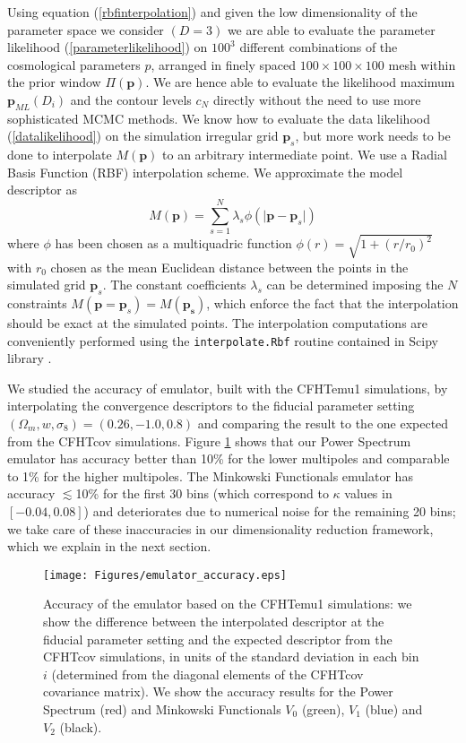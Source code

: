 \documentclass[reprint,aps,prd,superscriptaddress,showkeys,showpacs]{revtex4-1}
\begin{document}
Using equation (\ref{rbfinterpolation}) and given the low dimensionality of the parameter space we consider $(D=3)$ we are able to evaluate the parameter likelihood (\ref{parameterlikelihood}) on $100^3$ different combinations of the cosmological parameters $p$, arranged in finely spaced $100\times100\times100$ mesh within the prior window $\Pi(\mathbf{p})$. We are hence able to evaluate the likelihood maximum $\mathbf{p}_{ML}(D_i)$ and the contour levels $c_N$ directly without the need to use more sophisticated MCMC methods. We know how to evaluate the data likelihood (\ref{datalikelihood}) on the simulation irregular grid $\mathbf{p}_s$, but more work needs to be done to interpolate $M(\mathbf{p})$ to an arbitrary intermediate point. We use a Radial Basis Function (RBF) interpolation scheme. We approximate the model descriptor as
\begin{equation}
\label{rbfinterpolation}
M(\mathbf{p}) = \sum_{s=1}^N \lambda_s\phi(\vert\mathbf{p}-\mathbf{p}_s\vert)
\end{equation}
%
where $\phi$ has been chosen as a multiquadric function $\phi(r)=\sqrt{1+(r/r_0)^2}$ with $r_0$ chosen as the mean Euclidean distance between the points in the simulated grid $\mathbf{p}_s$. The constant coefficients $\lambda_s$ can be determined imposing the $N$ constraints $M(\mathbf{p}=\mathbf{p}_s)=M(\mathbf{p_s})$, which enforce the fact that the interpolation should be exact at the simulated points. The interpolation computations are conveniently performed using the \texttt{interpolate.Rbf} routine contained in Scipy library \citep{scipy}. 

We studied the accuracy of emulator, built with the CFHTemu1 simulations, by interpolating the convergence descriptors to the fiducial parameter setting $(\Omega_m,w,\sigma_8)=(0.26,-1.0,0.8)$ and comparing the result to the one expected from the CFHTcov simulations. Figure \ref{emulatorAccuracy} shows that our Power Spectrum emulator has accuracy better than 10\% for the lower multipoles and comparable to 1\% for the higher multipoles. The Minkowski Functionals emulator has accuracy $\lesssim$10\% for the first 30 bins (which correspond to $\kappa$ values in $[-0.04,0.08]$) and deteriorates due to numerical noise for the remaining 20 bins; we take care of these inaccuracies in our dimensionality reduction framework, which we explain in the next section. 

\begin{figure}
\begin{center}
\texttt{[image: Figures/emulator\_accuracy.eps]}
\end{center}
\caption{Accuracy of the emulator based on the CFHTemu1 simulations: we show the difference between the interpolated descriptor at the fiducial parameter setting and the expected descriptor from the CFHTcov simulations, in units of the standard deviation in each bin $i$ (determined from the diagonal elements of the CFHTcov covariance matrix). We show the accuracy results for the Power Spectrum (red) and Minkowski Functionals $V_0$ (green), $V_1$ (blue) and $V_2$ (black).}
\label{emulatorAccuracy}
\end{figure}  
\end{document}
